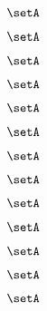 \begin{forslides}
\begin{forslides}
    \begin{equation}
        \label{eq:slides-translation-86}
        \setA
    \end{equation}

    \begin{equation}
        \label{eq:slides-translation-87}
        \setA
    \end{equation}

    \begin{equation}
        \label{eq:slides-translation-88}
        \setA
    \end{equation}

    \begin{equation}
        \label{eq:slides-translation-89}
        \setA
    \end{equation}

    \begin{equation}
        \label{eq:slides-translation-90}
        \setA
    \end{equation}

    \begin{equation}
        \label{eq:slides-translation-91}
        \setA
    \end{equation}

    \begin{equation}
        \label{eq:slides-translation-92}
        \setA
    \end{equation}

    \begin{equation}
        \label{eq:slides-translation-93}
        \setA
    \end{equation}

    \begin{equation}
        \label{eq:slides-translation-94}
        \setA
    \end{equation}

    \begin{equation}
        \label{eq:slides-translation-95}
        \setA
    \end{equation}

    \begin{equation}
        \label{eq:slides-translation-96}
        \setA
    \end{equation}

    \begin{equation}
        \label{eq:slides-translation-97}
        \setA
    \end{equation}

    \begin{equation}
        \label{eq:slides-translation-98}
        \setA
    \end{equation}


\end{forslides}
\end{forslides}

